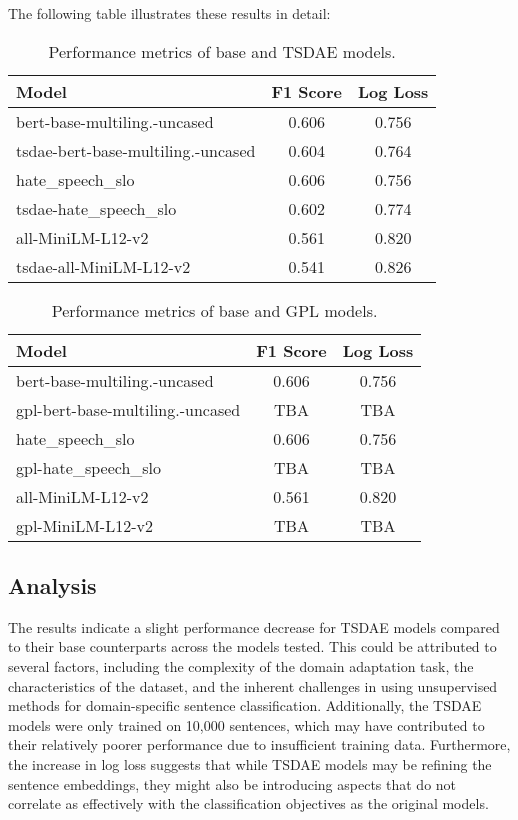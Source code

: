 \documentclass[fleqn,moreauthors,10pt]{ds_report}
\begin{document}
The following table illustrates these results in detail:

\begin{table}[h]
\centering
\begin{tabular}{|l|c|c|}
\hline
\textbf{Model} & \textbf{F1 Score} & \textbf{Log Loss} \\
\hline
bert-base-multiling.-uncased & 0.606 & 0.756 \\
tsdae-bert-base-multiling.-uncased & 0.604 & 0.764 \\
hate\_speech\_slo & 0.606 & 0.756 \\
tsdae-hate\_speech\_slo & 0.602 & 0.774 \\
all-MiniLM-L12-v2 & 0.561 & 0.820 \\
tsdae-all-MiniLM-L12-v2 & 0.541 & 0.826 \\
\hline
\end{tabular}
\caption{Performance metrics of base and TSDAE models.}
\label{table:tsdae_performance}
\end{table}


\begin{table}[h]
\centering
\begin{tabular}{|l|c|c|}
\hline
\textbf{Model} & \textbf{F1 Score} & \textbf{Log Loss} \\
\hline
bert-base-multiling.-uncased & 0.606 & 0.756 \\
gpl-bert-base-multiling.-uncased & TBA & TBA \\
hate\_speech\_slo & 0.606 & 0.756 \\
gpl-hate\_speech\_slo & TBA & TBA \\
all-MiniLM-L12-v2 & 0.561 & 0.820 \\
gpl-MiniLM-L12-v2 & TBA & TBA \\
\hline
\end{tabular}
\caption{Performance metrics of base and GPL models.}
\label{table:tsdae_performance}
\end{table}

\subsection*{Analysis}

The results indicate a slight performance decrease for TSDAE models compared to their base counterparts across the models tested. This could be attributed to several factors, including the complexity of the domain adaptation task, the characteristics of the dataset, and the inherent challenges in using unsupervised methods for domain-specific sentence classification. Additionally, the TSDAE models were only trained on 10,000 sentences, which may have contributed to their relatively poorer performance due to insufficient training data. Furthermore, the increase in log loss suggests that while TSDAE models may be refining the sentence embeddings, they might also be introducing aspects that do not correlate as effectively with the classification objectives as the original models.
\end{document}
